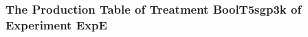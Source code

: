  \begin{frame}
 \fontsize{8pt}{9pt}\selectfont
 \frametitle{ The Production Table of Treatment BoolT5sgp3k of Experiment ExpE }

 \label{ExpEGrammarTable009.tex}  
 \end{frame}

